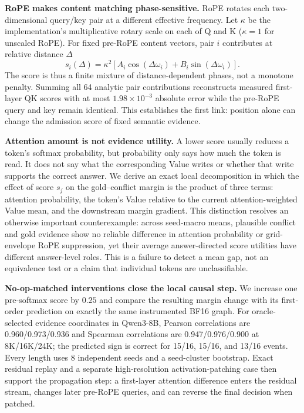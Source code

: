 \textbf{RoPE makes content matching phase-sensitive.}
RoPE rotates each two-dimensional query/key pair at a different effective
frequency.  Let $\kappa$ be the implementation's multiplicative rotary scale
on each of Q and K ($\kappa=1$ for unscaled RoPE).  For fixed pre-RoPE content
vectors, pair $i$ contributes at relative distance $\Delta$
\begin{equation}
  s_i(\Delta)
  = \kappa^2\!\left[A_i\cos(\Delta\omega_i)+B_i\sin(\Delta\omega_i)\right].
  \label{eq:intro-phase}
\end{equation}
The score is thus a finite mixture of distance-dependent phases, not a monotone
penalty.  Summing all 64 analytic pair contributions reconstructs measured
first-layer QK scores with at most $1.98\times10^{-3}$ absolute error while the
pre-RoPE query and key remain identical.  This establishes the first link:
position alone can change the admission score of fixed semantic evidence.

\textbf{Attention amount is not evidence utility.}
A lower score usually reduces a token's softmax probability, but probability
only says how much the token is read.  It does not say what the corresponding
Value writes or whether that write supports the correct answer.  We derive an
exact local decomposition in which the effect of score $s_j$ on the
gold--conflict margin is the product of three terms: attention probability,
the token's Value relative to the current attention-weighted Value mean, and
the downstream margin gradient.  This distinction resolves an otherwise
important counterexample: across seed-macro means, plausible conflict and gold
evidence show no reliable difference in attention probability or grid-envelope
RoPE suppression, yet their average answer-directed score utilities have different
answer-level roles.  This is a failure to detect a mean gap, not an equivalence
test or a claim that individual tokens are unclassifiable.

\textbf{No-op-matched interventions close the local causal step.}
We increase one pre-softmax score by $0.25$ and compare the resulting margin
change with its first-order prediction on exactly the same instrumented BF16
graph.  For oracle-selected evidence coordinates in Qwen3-8B, Pearson
correlations are 0.960/0.973/0.936 and Spearman correlations are
0.947/0.976/0.900 at 8K/16K/24K; the predicted sign is correct for
15/16, 15/16, and 13/16 events.  Every length uses 8 independent seeds and a
seed-cluster bootstrap.  Exact residual replay and a separate high-resolution
activation-patching case then support the propagation step: a first-layer
attention difference enters the residual stream, changes later pre-RoPE
queries, and can reverse the final decision when patched.

